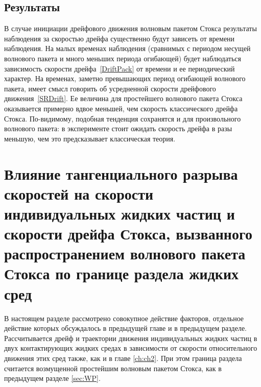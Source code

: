 \subsection{Результаты}

В случае инициации дрейфового движения волновым пакетом Стокса результаты наблюдения за скоростью дрейфа существенно будут зависеть от времени наблюдения. На малых временах наблюдения (сравнимых с периодом несущей волнового пакета и много меньших периода огибающей) будет наблюдаться зависимость скорости дрейфа~\eqref{DriftPack} от времени и ее периодический характер. На временах, заметно превышающих период огибающей волнового пакета, имеет смысл говорить об усредненной скорости дрейфового движения~\eqref{SRDrift}. Ее величина для простейшего волнового пакета Стокса оказывается примерно вдвое меньшей, чем скорость классического дрейфа Стокса. По-видимому, подобная тенденция сохранятся и для произвольного волнового пакета: в эксперименте стоит ожидать скорость дрейфа в разы меньшую, чем это предсказывает классическая теория.

\section{Влияние тангенциального разрыва скоростей на скорости индивидуальных жидких частиц и скорости дрейфа Стокса, вызванного распространением волнового пакета Стокса по границе раздела жидких сред}
  
В настоящем разделе рассмотрено совокупное действие факторов, отдельное действие которых обсуждалось в предыдущей главе и в предыдущем разделе. Рассчитывается дрейф и траектории движения индивидуальных жидких частиц в двух контактирующих жидких средах в зависимости от скорости относительного движения этих сред также, как и в главе \ref{ch:ch2}. При этом граница раздела считается возмущенной простейшим волновым пакетом Стокса, как в предыдущем разделе \ref{sec:WP}.


